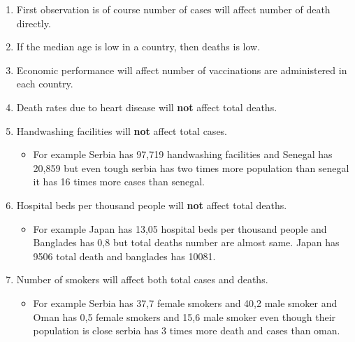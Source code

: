 \documentclass{article}
\begin{document}
\begin{enumerate}
  \item First observation is of course number of cases will affect number of death directly.
  \item If the median age is low in a country, then deaths is low.
  \item Economic performance will affect number of vaccinations are administered in each country.
  \item Death rates due to heart disease will \textbf{not} affect total deaths.
  \item Handwashing facilities will \textbf{not} affect total cases.
  	\begin{itemize}
    \item For example Serbia has 97,719 handwashing facilities and Senegal has 20,859 but even tough serbia has two times more population than senegal
    it has 16 times more cases than senegal.
  \end{itemize}
  \item Hospital beds per thousand people will \textbf{not} affect total deaths.
  	\begin{itemize}
    \item For example Japan has 13,05 hospital beds per thousand people and Banglades has 0,8 but total deaths number are almost same. Japan has 9506
    total death and banglades has 10081.
  \end{itemize}
  \item Number of smokers will affect both total cases and deaths.
  	\begin{itemize}
    \item For example Serbia has 37,7 female smokers and 40,2 male smoker and Oman has 0,5 female smokers and 15,6 male smoker even though their
    population is close serbia has 3 times more death and cases than oman.
  \end{itemize}
\end{enumerate}
\end{document}
